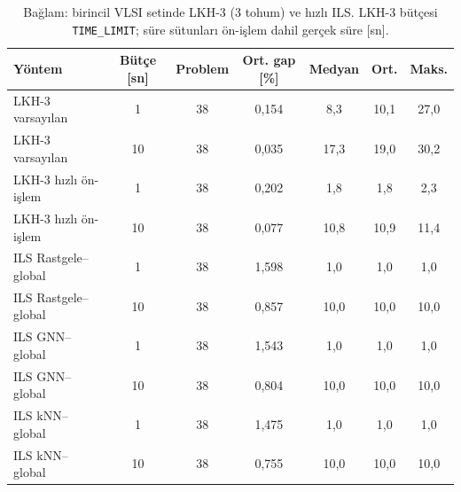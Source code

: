 \begin{table}[!htbp]
\centering\small\setlength{\tabcolsep}{3pt}
\caption{Bağlam: birincil VLSI setinde LKH-3 (3 tohum) ve hızlı ILS. LKH-3 bütçesi \texttt{TIME\_LIMIT}; süre sütunları ön-işlem dahil gerçek süre [sn].}
\label{tab:v2-lkh}
\begin{tabular*}{\textwidth}{@{\extracolsep{\fill}}lcccccc}
\toprule
Yöntem & Bütçe [sn] & Problem & Ort. gap [\%] & Medyan & Ort. & Maks. \\
\midrule
LKH-3 varsayılan & 1 & 38 & 0{,}154 & 8{,}3 & 10{,}1 & 27{,}0 \\
LKH-3 varsayılan & 10 & 38 & 0{,}035 & 17{,}3 & 19{,}0 & 30{,}2 \\
LKH-3 hızlı ön-işlem & 1 & 38 & 0{,}202 & 1{,}8 & 1{,}8 & 2{,}3 \\
LKH-3 hızlı ön-işlem & 10 & 38 & 0{,}077 & 10{,}8 & 10{,}9 & 11{,}4 \\
ILS Rastgele--global & 1 & 38 & 1{,}598 & 1{,}0 & 1{,}0 & 1{,}0 \\
ILS Rastgele--global & 10 & 38 & 0{,}857 & 10{,}0 & 10{,}0 & 10{,}0 \\
ILS GNN--global & 1 & 38 & 1{,}543 & 1{,}0 & 1{,}0 & 1{,}0 \\
ILS GNN--global & 10 & 38 & 0{,}804 & 10{,}0 & 10{,}0 & 10{,}0 \\
ILS kNN--global & 1 & 38 & 1{,}475 & 1{,}0 & 1{,}0 & 1{,}0 \\
ILS kNN--global & 10 & 38 & 0{,}755 & 10{,}0 & 10{,}0 & 10{,}0 \\
\bottomrule
\end{tabular*}
\end{table}
